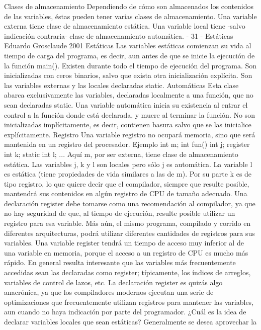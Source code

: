 Clases de almacenamiento
Dependiendo de cómo son almacenados los contenidos de las variables, éstas pueden tener varias
clases de almacenamiento. Una variable externa tiene clase de almacenamiento estática. Una
variable local tiene -salvo indicación contraria- clase de almacenamiento automática.
- 31 -
Estáticas
Eduardo Grosclaude 2001
Estáticas
Las variables estáticas comienzan su vida al tiempo de carga del programa, es decir, aun antes de que
se inicie la ejecución de la función main(). Existen durante todo el tiempo de ejecución del programa.
Son inicializadas con ceros binarios, salvo que exista otra inicialización explícita. Son las variables
externas y las locales declaradas static.
Automáticas
Esta clase abarca exclusivamente las variables, declaradas localmente a una función, que no sean
declaradas static. Una variable automática inicia su existencia al entrar el control a la función donde
está declarada, y muere al terminar la función. No son inicializadas implícitamente, es decir, contienen
basura salvo que se las inicialice explícitamente.
Registro
Una variable registro no ocupará memoria, sino que será mantenida en un registro del procesador.
Ejemplo
int m;
int fun()
{
int j;
register int k;
static int l;
...
}
Aquí m, por ser externa, tiene clase de almacenamiento estática. Las variables j, k y l son locales pero
sólo j es automática. La variable l es estática (tiene propiedades de vida similares a las de m). Por su
parte k es de tipo registro, lo que quiere decir que el compilador, siempre que resulte posible,
mantendrá sus contenidos en algún registro de CPU de tamaño adecuado. Una declaración register
debe tomarse como una recomendación al compilador, ya que no hay seguridad de que, al tiempo de
ejecución, resulte posible utilizar un registro para esa variable. Más aún, el mismo programa,
compilado y corrido en diferentes arquitecturas, podrá utilizar diferentes cantidades de registros para
sus variables.
Una variable register tendrá un tiempo de acceso muy inferior al de una variable en memoria, porque
el acceso a un registro de CPU es mucho más rápido. En general resulta interesante que las variables
más frecuentemente accedidas sean las declaradas como register; típicamente, los índices de arreglos,
variables de control de lazos, etc.
La declaración register es quizás algo anacrónica, ya que los compiladores modernos ejecutan una
serie de optimizaciones que frecuentemente utilizan registros para mantener las variables, aun cuando
no haya indicación por parte del programador.
¿Cuál es la idea de declarar variables locales que sean estáticas? Generalmente se desea aprovechar la
